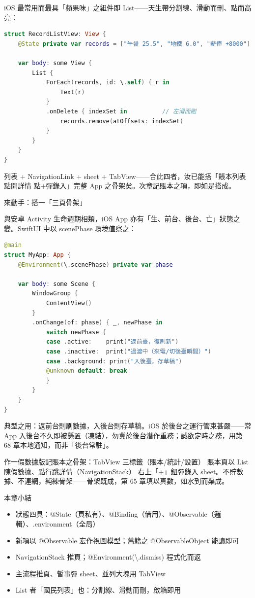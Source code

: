 iOS 最常用而最具「蘋果味」之組件即 List——天生帶分割線、滑動而刪、點而高亮：

\begin{lstlisting}[language=Swift]
struct RecordListView: View {
    @State private var records = ["午餐 25.5", "地鐵 6.0", "薪俸 +8000"]

    var body: some View {
        List {
            ForEach(records, id: \.self) { r in
                Text(r)
            }
            .onDelete { indexSet in          // 左滑而刪
                records.remove(atOffsets: indexSet)
            }
        }
    }
}
\end{lstlisting}

列表 + NavigationLink + sheet + TabView——合此四者，汝已能搭「賬本列表 點開詳情 點+彈錄入」完整 App 之骨架矣。次章記賬本之項，即如是搭成。

\begin{tcbpractice}{來動手：搭一「三頁骨架」}

與安卓 Activity 生命週期相類，iOS App 亦有「生、前台、後台、亡」狀態之變。SwiftUI 中以 scenePhase 環境值察之：

\begin{lstlisting}[language=Swift]
@main
struct MyApp: App {
    @Environment(\.scenePhase) private var phase

    var body: some Scene {
        WindowGroup {
            ContentView()
        }
        .onChange(of: phase) { _, newPhase in
            switch newPhase {
            case .active:    print("返前臺，復刷新")
            case .inactive:  print("過渡中（來電/切後臺瞬間）")
            case .background: print("入後臺，存草稿")
            @unknown default: break
            }
        }
    }
}
\end{lstlisting}

典型之用：返前台則刷數據，入後台則存草稿。iOS 於後台之運行管束甚嚴——常 App 入後台不久即被懸置（凍結），勿冀於後台潛作重務；誠欲定時之務，用第 68 章本地通知，而非「後台常駐」。

作一假數據版記賬本之骨架：TabView 三標籤（賬本/統計/設置） 賬本頁以 List 陳假數據、點行跳詳情（NavigationStack） 右上「+」鈕彈錄入 sheet。不貯數據、不連網，純練骨架——骨架既成，第 65 章填以真數，如水到而渠成。

\end{tcbpractice}

\begin{tcbsummary}{本章小結}
\begin{itemize}
  \item 狀態四具：@State（頁私有）、@Binding（借用）、@Observable（邏輯）、.environment（全局）
  \item 新項以 @Observable 宏作視圖模型；舊籍之 @ObservableObject 能讀即可
  \item NavigationStack 推頁；@Environment(\textbackslash{}.dismiss) 程式化而返
  \item 主流程推頁、暫事彈 sheet、並列大塊用 TabView
  \item List 者「國民列表」也：分割線、滑動而刪，啟箱即用
\end{itemize}

\end{tcbsummary}
